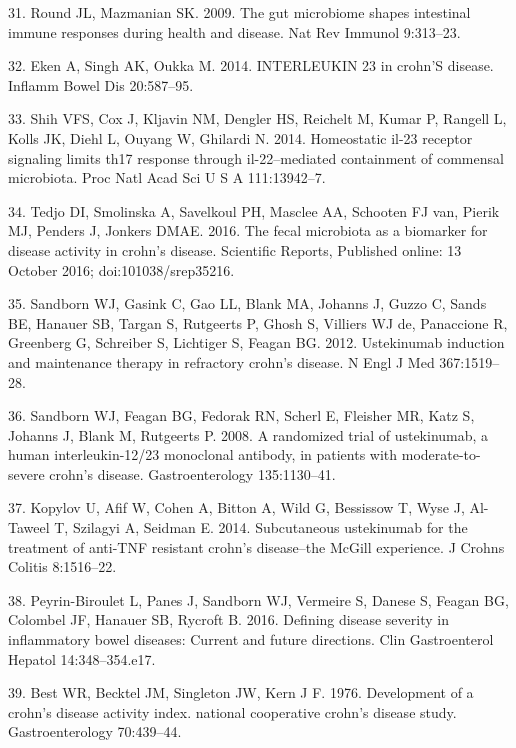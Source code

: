 \documentclass[12pt,]{article}
\begin{document}
\hypertarget{ref-Round_IL23microbiome_2009}{}
31. Round JL, Mazmanian SK. 2009. The gut microbiome shapes intestinal
immune responses during health and disease. Nat Rev Immunol 9:313--23.

\hypertarget{ref-Eken_IL23CD_2014}{}
32. Eken A, Singh AK, Oukka M. 2014. INTERLEUKIN 23 in crohn'S disease.
Inflamm Bowel Dis 20:587--95.

\hypertarget{ref-Shih_IL23Th17_2014}{}
33. Shih VFS, Cox J, Kljavin NM, Dengler HS, Reichelt M, Kumar P,
Rangell L, Kolls JK, Diehl L, Ouyang W, Ghilardi N. 2014. Homeostatic
il-23 receptor signaling limits th17 response through il-22--mediated
containment of commensal microbiota. Proc Natl Acad Sci U S A
111:13942--7.

\hypertarget{ref-tedjo_CDactivity_2016}{}
34. Tedjo DI, Smolinska A, Savelkoul PH, Masclee AA, Schooten FJ van,
Pierik MJ, Penders J, Jonkers DMAE. 2016. The fecal microbiota as a
biomarker for disease activity in crohn's disease. Scientific Reports,
Published online: 13 October 2016; doi:101038/srep35216.

\hypertarget{ref-sandborn_ust_2012}{}
35. Sandborn WJ, Gasink C, Gao LL, Blank MA, Johanns J, Guzzo C, Sands
BE, Hanauer SB, Targan S, Rutgeerts P, Ghosh S, Villiers WJ de,
Panaccione R, Greenberg G, Schreiber S, Lichtiger S, Feagan BG. 2012.
Ustekinumab induction and maintenance therapy in refractory crohn's
disease. N Engl J Med 367:1519--28.

\hypertarget{ref-sandborn_ust_2008}{}
36. Sandborn WJ, Feagan BG, Fedorak RN, Scherl E, Fleisher MR, Katz S,
Johanns J, Blank M, Rutgeerts P. 2008. A randomized trial of
ustekinumab, a human interleukin-12/23 monoclonal antibody, in patients
with moderate-to-severe crohn's disease. Gastroenterology 135:1130--41.

\hypertarget{ref-kopylov_ust_2014}{}
37. Kopylov U, Afif W, Cohen A, Bitton A, Wild G, Bessissow T, Wyse J,
Al-Taweel T, Szilagyi A, Seidman E. 2014. Subcutaneous ustekinumab for
the treatment of anti-TNF resistant crohn's disease--the McGill
experience. J Crohns Colitis 8:1516--22.

\hypertarget{ref-PB_CDAI_2016}{}
38. Peyrin-Biroulet L, Panes J, Sandborn WJ, Vermeire S, Danese S,
Feagan BG, Colombel JF, Hanauer SB, Rycroft B. 2016. Defining disease
severity in inflammatory bowel diseases: Current and future directions.
Clin Gastroenterol Hepatol 14:348--354.e17.

\hypertarget{ref-Best_CDAI_1976}{}
39. Best WR, Becktel JM, Singleton JW, Kern J F. 1976. Development of a
crohn's disease activity index. national cooperative crohn's disease
study. Gastroenterology 70:439--44.
\end{document}
